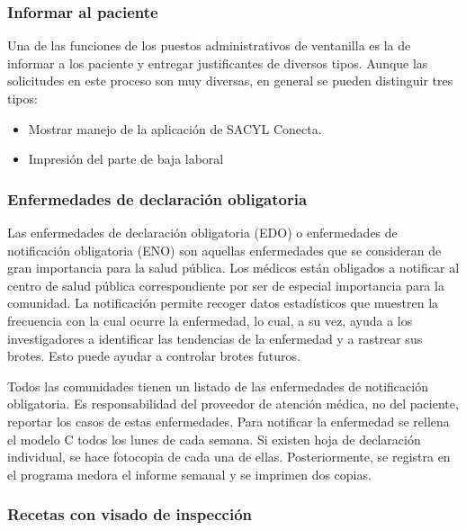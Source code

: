 \subsubsection{Informar al paciente}

Una de las funciones de los puestos administrativos de ventanilla es la de informar a los paciente y entregar justificantes de diversos tipos. Aunque las solicitudes en este proceso son muy diversas, en general se pueden distinguir tres tipos:

\begin{itemize}
    \item Mostrar manejo de la aplicación de SACYL Conecta.
    \item Impresión del parte de baja laboral
\end{itemize}

\subsubsection{Enfermedades de declaración obligatoria}

Las enfermedades de declaración obligatoria (EDO) o enfermedades de notificación obligatoria (ENO) son aquellas enfermedades que se consideran de gran importancia para la salud pública. Los médicos están obligados a notificar al centro de salud pública correspondiente por ser de especial importancia para la comunidad.
La notificación permite recoger datos estadísticos que muestren la frecuencia con la cual ocurre la enfermedad, lo cual, a su vez, ayuda a los investigadores a identificar las tendencias de la enfermedad y a rastrear sus brotes. Esto puede ayudar a controlar brotes futuros.

Todos las comunidades tienen un listado de las enfermedades de notificación obligatoria.
Es responsabilidad del proveedor de atención médica, no del paciente, reportar los casos de estas enfermedades.
Para notificar la enfermedad se rellena el modelo C todos los lunes de cada semana.
Si existen hoja de declaración individual, se hace fotocopia de cada una de ellas.
Posteriormente, se registra en el programa \Gls{medora} el informe semanal y se imprimen dos copias.


\subsubsection{Recetas con visado de inspección}

